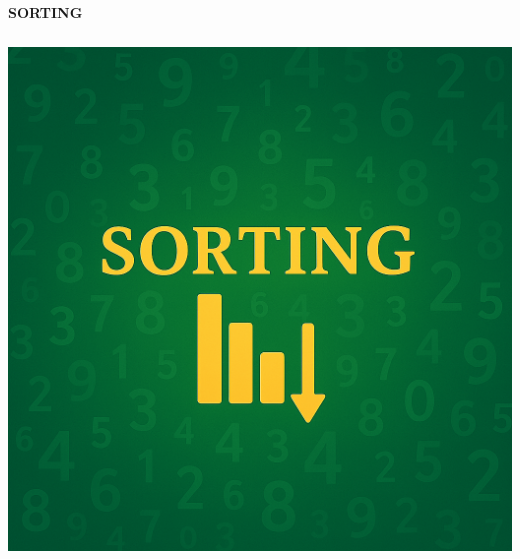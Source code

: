 \documentclass[a4paper,10pt]{book}
\begin{document}
\begin{center}

{\fontsize{55}{20}\selectfont \textcolor{headingcolor}{\bfseries SORTING}}
\end{center}

\vspace{50mm}

\begin{center}
\includegraphics[height=13.88cm, width=17cm, keepaspectratio]{Pics/sort.png}
\end{center}
\end{document}
